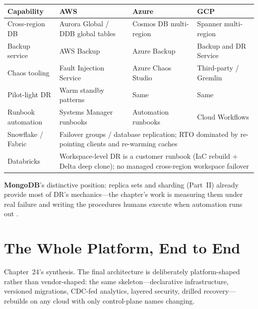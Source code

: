 \begin{center}
\footnotesize
\begin{tabular}{@{}p{2.9cm}p{3.0cm}p{3.0cm}p{3.0cm}@{}}
\toprule
\textbf{Capability} & \textbf{AWS} & \textbf{Azure} & \textbf{GCP} \\
\midrule
Cross-region DB & Aurora Global / DDB global tables & Cosmos DB multi-region & Spanner multi-region \\
Backup service & AWS Backup & Azure Backup & Backup and DR Service \\
Chaos tooling & Fault Injection Service & Azure Chaos Studio & Third-party / Gremlin \\
Pilot-light DR & Warm standby patterns & Same & Same \\
Runbook automation & Systems Manager runbooks & Automation runbooks & Cloud Workflows \\
\addlinespace
Snowflake / Fabric & \multicolumn{3}{l}{Failover groups / database replication; RTO dominated by re-pointing clients and re-warming caches} \\
Databricks & \multicolumn{3}{l}{Workspace-level DR is a customer runbook (IaC rebuild + Delta deep clone); no managed cross-region workspace failover} \\
\bottomrule
\end{tabular}
\end{center}

\noindent \textbf{MongoDB}'s distinctive position: replica sets and sharding (Part~II) already
provide most of DR's mechanics---the chapter's work is measuring them under real failure and
writing the procedures humans execute when automation runs out \cite{mongodbOpsManagerDocs,sreBook}.

\section{The Whole Platform, End to End}
%
Chapter~24's synthesis. The final architecture is deliberately platform-shaped rather than
vendor-shaped: the same skeleton---declarative infrastructure, versioned migrations, CDC-fed
analytics, layered security, drilled recovery---rebuilds on any cloud with only control-plane
names changing.

